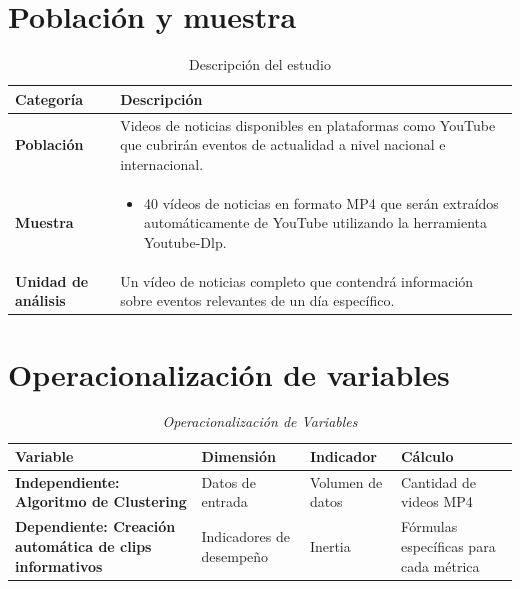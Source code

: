 \section{Población y muestra}

\begin{table}[H]
	\centering
	\caption{Descripción del estudio}
	\begin{tabular}{p{5cm}p{10cm}}
		\hline
		\textbf{Categoría} & \textbf{Descripción} \\ \hline
		\textbf{Población} & Videos de noticias disponibles en plataformas como YouTube que cubrirán eventos de actualidad a nivel nacional e internacional. \\ \hline
		\textbf{Muestra} & 
		\begin{itemize}
			\item 40 vídeos de noticias en formato MP4 que serán extraídos automáticamente de YouTube utilizando la herramienta Youtube-Dlp.
		\end{itemize}
		\\ \hline
		\textbf{Unidad de análisis} & Un vídeo de noticias completo que contendrá información sobre eventos relevantes de un día específico. \\ \hline
	\end{tabular}
	\label{tabla:poblacion_muestra}
\end{table}

\section{Operacionalización de variables}

\begin{table}[H]
	\centering
	\caption{\textit{Operacionalización de Variables}}
	\begin{adjustbox}{max width=\textwidth}
	\begin{tabular}{p{4cm}p{4cm}p{4cm}p{4cm}}
		\hline
		\textbf{Variable} & \textbf{Dimensión} & \textbf{Indicador} & \textbf{Cálculo} \\ \hline
		\textbf{Independiente: Algoritmo de Clustering} 
		& Datos de entrada & Volumen de datos & Cantidad de videos MP4 \\ \cline{2-4}
		
		\textbf{Dependiente: Creación automática de clips informativos} 
		& Indicadores de desempeño & Inertia & Fórmulas específicas para cada métrica \\ \hline
	\end{tabular}
	\end{adjustbox}
	\label{tabla:operacionalizacion_variables}
\end{table}
